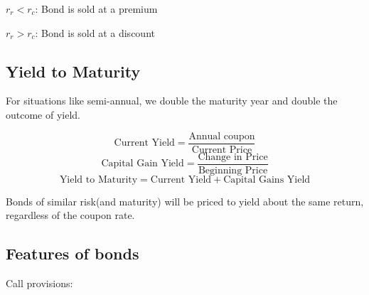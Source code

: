 \documentclass[10pt, a4paper]{article}
\begin{document}
$r_r < r_c$: Bond is sold at a premium

$r_r > r_c$: Bond is sold at a discount

\subsection{Yield to Maturity}
    For situations like semi-annual, we double the maturity year and double the outcome of yield.

    $$\text{Current Yield} = \frac{\text{Annual coupon}}{\text{Current Price}}$$
    $$\text{Capital Gain Yield} = \frac{\text{Change in Price}}{\text{Beginning Price}}$$
    $$\text{Yield to Maturity} = \text{Current Yield} + \text{Capital Gains Yield}$$

    Bonds of similar risk(and maturity) will be priced to yield about the same return, regardless of the coupon rate. 

\subsection{Features of bonds}
    Call provisions: 
\end{document}
